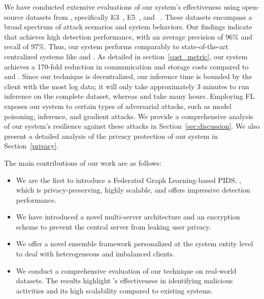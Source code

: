 


We have conducted extensive evaluations of our system's effectiveness using open-source datasets from \darpa, specifically E3~\cite{darpae3}, E5~\cite{darpae5}, and \optc~\cite{anjum2021analyzing}. These datasets encompass a broad spectrum of attack scenarios and system behaviors. Our findings indicate that \Sys achieves high detection performance, with an average precision of 96\% and recall of 97\%. Thus, our system performs comparably to state-of-the-art centralized systems like \flash and \kairos. As detailed in section~\ref{cost_metric}, our system achieves a 170-fold reduction in communication and storage costs compared to \flash and \kairos. Since our technique is decentralized, our inference time is bounded by the client with the most log data; it will only take approximately 3 minutes to run inference on the complete \optc dataset, whereas \flash and \kairos take many hours. Employing FL exposes our system to certain types of adversarial attacks, such as model poisoning, inference, and gradient attacks. We provide a comprehensive analysis of our system's resilience against these attacks in Section~\ref{sec:discussion}. We also present a detailed analysis of the privacy protection of our system in Section~\ref{privacy}.

The main contributions of our work are as follows:

\begin{itemize}[topsep=.1ex,itemsep=-.1ex,leftmargin=*]
    \item We are the first to introduce a Federated Graph Learning-based PIDS, \Sys, which is privacy-preserving, highly scalable, and offers impressive detection performance.
    \item We have introduced a novel multi-server architecture and an encryption scheme to prevent the central server from leaking user privacy.
    \item We offer a novel \gnnshort ensemble framework personalized at the system entity level to deal with heterogeneous and imbalanced clients.
    \item We conduct a comprehensive evaluation of our technique on real-world datasets. The results highlight \Sys's effectiveness in identifying malicious activities and its high scalability compared to existing systems.
\end{itemize}

 